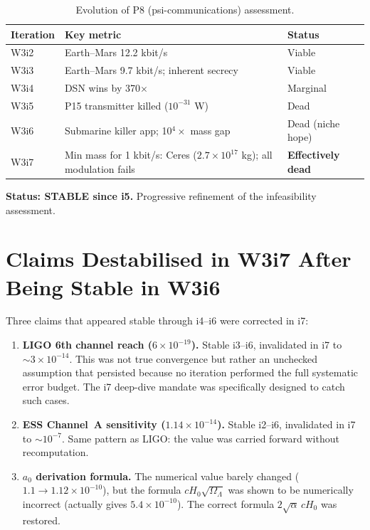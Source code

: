 \documentclass[11pt]{article}
\newcommand{\ee}[1]{\times 10^{#1}}
\begin{document}
\begin{table}[H]
\centering
\caption{Evolution of P8 (psi-communications) assessment.}
\label{tab:P8}
\begin{tabular}{lll}
\toprule
\textbf{Iteration} & \textbf{Key metric} & \textbf{Status} \\
\midrule
W3i2 & Earth--Mars 12.2 kbit/s & Viable \\
W3i3 & Earth--Mars 9.7 kbit/s; inherent secrecy & Viable \\
W3i4 & DSN wins by 370$\times$ & Marginal \\
W3i5 & P15 transmitter killed ($10^{-31}$ W) & Dead \\
W3i6 & Submarine killer app; 10$^4\times$ mass gap & Dead (niche hope) \\
W3i7 & Min mass for 1 kbit/s: Ceres ($2.7\ee{17}$ kg);
  all modulation fails & \textbf{Effectively dead} \\
\bottomrule
\end{tabular}
\end{table}

\textbf{Status: STABLE since i5.} Progressive refinement of the
infeasibility assessment.


\section{Claims Destabilised in W3i7 After Being Stable in W3i6}
\label{sec:destabilised}

Three claims that appeared stable through i4--i6 were corrected in i7:

\begin{enumerate}
\item \textbf{LIGO 6th channel reach ($6\ee{-19}$).} Stable i3--i6,
  invalidated in i7 to $\sim 3\ee{-14}$. This was not true convergence
  but rather an unchecked assumption that persisted because no iteration
  performed the full systematic error budget. The i7 deep-dive mandate
  was specifically designed to catch such cases.

\item \textbf{ESS Channel~A sensitivity ($1.14\ee{-14}$).} Stable i2--i6,
  invalidated in i7 to $\sim 10^{-7}$. Same pattern as LIGO: the value
  was carried forward without recomputation.

\item \textbf{$a_0$ derivation formula.} The numerical value barely changed
  ($1.1 \to 1.12\ee{-10}$), but the formula
  $cH_0\sqrt{\Omega_\Lambda}$ was shown to be numerically incorrect
  (actually gives $5.4\ee{-10}$). The correct formula
  $2\sqrt{\alpha}\,cH_0$ was restored.
\end{enumerate}
\end{document}
